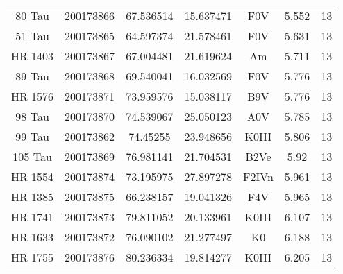 \begin{table*}
\begin{tabular}{ccccccc}
80 Tau & 200173866 & 67.536514 & 15.637471 & F0V & 5.552 & 13 \\
51 Tau & 200173865 & 64.597374 & 21.578461 & F0V & 5.631 & 13 \\
HR 1403 & 200173867 & 67.004481 & 21.619624 & Am & 5.711 & 13 \\
89 Tau & 200173868 & 69.540041 & 16.032569 & F0V & 5.776 & 13 \\
HR 1576 & 200173871 & 73.959576 & 15.038117 & B9V & 5.776 & 13 \\
98 Tau & 200173870 & 74.539067 & 25.050123 & A0V & 5.785 & 13 \\
99 Tau & 200173862 & 74.45255 & 23.948656 & K0III & 5.806 & 13 \\
105 Tau & 200173869 & 76.981141 & 21.704531 & B2Ve & 5.92 & 13 \\
HR 1554 & 200173874 & 73.195975 & 27.897278 & F2IVn & 5.961 & 13 \\
HR 1385 & 200173875 & 66.238157 & 19.041326 & F4V & 5.965 & 13 \\
HR 1741 & 200173873 & 79.811052 & 20.133961 & K0III & 6.107 & 13 \\
HR 1633 & 200173872 & 76.090102 & 21.277497 & K0 & 6.188 & 13 \\
HR 1755 & 200173876 & 80.236334 & 19.814277 & K0III & 6.205 & 13 \\
\hline
\end{tabular}
\end{table*}
